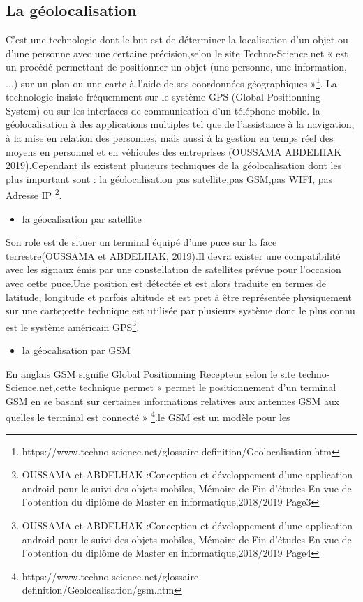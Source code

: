 \documentclass[a4paper, 12pt]{article}
\begin{document}
\subsection{La géolocalisation}
\quad C’est une technologie dont le but est de déterminer la localisation d’un objet ou d’une personne avec une certaine précision,selon le site Techno-Science.net « est un procédé permettant de positionner un objet (une personne, une information, ...) sur un plan ou une carte à l'aide de ses coordonnées géographiques »\footnote{https://www.techno-science.net/glossaire-definition/Geolocalisation.htm}. La technologie insiste fréquemment sur le système GPS (Global Positionning  System) ou sur les interfaces de communication d’un téléphone mobile.  la géolocalisation à des applications multiples tel que:de l’assistance à la navigation, à la mise en relation des personnes, mais aussi à la gestion en temps réel des moyens en personnel et en véhicules des entreprises (OUSSAMA ABDELHAK 2019).Cependant ils existent plusieurs techniques de la géolocalisation dont les plus important sont : la géolocalisation pas satellite,pas GSM,pas WIFI, pas Adresse IP \footnote{OUSSAMA et ABDELHAK :Conception et développement d’une application android pour le suivi des objets mobiles, Mémoire de Fin d’études En vue de l’obtention du diplôme de Master en informatique,2018/2019 Page3}.
\begin{itemize}
\item la géocalisation par satellite
\end{itemize}
\quad Son role est de situer un terminal équipé d'une puce sur la face terrestre(OUSSAMA et ABDELHAK, 2019).Il devra exister une compatibilité avec les signaux émis par une constellation de satellites prévue pour l'occasion avec cette puce.Une position est détectée et est alors traduite en termes de latitude, longitude et parfois altitude et est pret à être représentée physiquement sur une carte;cette technique est utilisée par plusieurs système donc le plus connu est le système américain GPS\footnote{OUSSAMA et ABDELHAK :Conception et développement d’une application android pour le suivi des objets mobiles, Mémoire de Fin d’études En vue de l’obtention du diplôme de Master en informatique,2018/2019 Page4}.
\begin{itemize}
\item la géocalisation par GSM
\end{itemize}
\quad En anglais GSM signifie Global Positionning Recepteur selon le site techno-Science.net,cette technique permet « permet le positionnement d'un terminal GSM en se basant sur certaines informations relatives aux antennes GSM aux quelles le terminal est  connecté » \footnote{https://www.techno-science.net/glossaire-definition/Geolocalisation/gsm.htm}.le GSM est un modèle pour les
\end{document}

